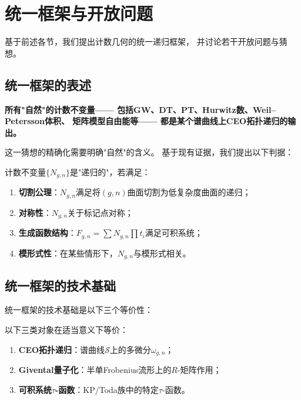 
\section{统一框架与开放问题}\label{sec:unified}

基于前述各节，我们提出计数几何的统一递归框架，
并讨论若干开放问题与猜想。

\subsection{统一框架的表述}

\begin{conjecture}[递归统一猜想]\label{conj:unified}
\textbf{所有"自然"的计数不变量——
包括GW、DT、PT、Hurwitz数、Weil--Petersson体积、
矩阵模型自由能等——
都是某个谱曲线上CEO拓扑递归的输出。}
\end{conjecture}

这一猜想的精确化需要明确"自然"的含义。
基于现有证据，我们提出以下判据：

\begin{definition}[递归不变量的判据]\label{crit:recursive}
计数不变量$\{N_{g,n}\}$是"递归的"，若满足：
\begin{enumerate}[label=(\roman*)]
\item \textbf{切割公理}：$N_{g,n}$满足将$(g,n)$曲面切割为低复杂度曲面的递归；
\item \textbf{对称性}：$N_{g,n}$关于标记点对称；
\item \textbf{生成函数结构}：$F_{g,n} = \sum N_{g,n} \prod t_i$满足可积系统；
\item \textbf{模形式性}：在某些情形下，$N_{g,n}$与模形式相关。
\end{enumerate}
\end{definition}

\subsection{统一框架的技术基础}

统一框架的技术基础是以下三个等价性：

\begin{theorem}[三重等价性]\label{thm:triple}
以下三类对象在适当意义下等价：
\begin{enumerate}[label=(\arabic*)]
\item \textbf{CEO拓扑递归}：谱曲线$\mathcal{S}$上的多微分$\omega_{g,n}$；
\item \textbf{Givental量子化}：半单Frobenius流形上的$R$-矩阵作用；
\item \textbf{可积系统$\tau$-函数}：KP/Toda族中的特定$\tau$-函数。
\end{enumerate}
\end{theorem}

